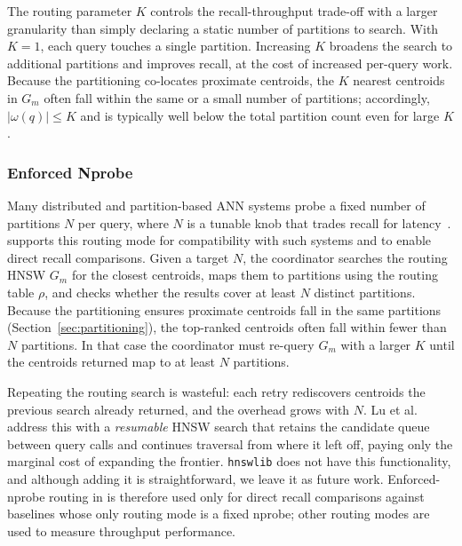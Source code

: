 \documentclass[sigconf,review,anonymous]{acmart}
\begin{document}
    The routing parameter $K$ controls the recall-throughput trade-off with a larger granularity than simply declaring a static number of partitions to search. With $K = 1$, each query touches a single partition. Increasing $K$ broadens the search to additional partitions and improves recall, at the cost of increased per-query work. Because the partitioning co-locates proximate centroids, the $K$ nearest centroids in $G_m$ often fall within the same or a small number of partitions; accordingly, $|\omega(q)| \leq K$ and is typically well below the total partition count even for large $K$ \cite{deng2019pyramid}.

\subsubsection{Enforced Nprobe}
    \label{sec:enforced-nprobe}
    Many distributed and partition-based ANN systems probe a fixed number of partitions $N$ per query, where $N$ is a tunable knob that trades recall for latency~\cite{gottesbueren2025unleashing, mohoney2025quake, jegou2011searching, chen2021spann}. \SystemName{} supports this routing mode for compatibility with such systems and to enable direct recall comparisons. Given a target $N$, the coordinator searches the routing HNSW $G_m$ for the closest centroids, maps them to partitions using the routing table $\rho$, and checks whether the results cover at least $N$ distinct partitions. Because the partitioning ensures proximate centroids fall in the same partitions (Section~\ref{sec:partitioning}), the top-ranked centroids often fall within fewer than $N$ partitions. In that case the coordinator must re-query $G_m$ with a larger $K$ until the centroids returned map to at least $N$ partitions.
    
    Repeating the routing search is wasteful: each retry rediscovers centroids the previous search already returned, and the overhead grows with $N$. Lu et al.~\cite{lu2026depth} address this with a \emph{resumable} HNSW search that retains the candidate queue between query calls and continues traversal from where it left off, paying only the marginal cost of expanding the frontier. \texttt{hnswlib} does not have this functionality, and although adding it is straightforward, we leave it as future work. Enforced-nprobe routing in \SystemName{} is therefore used only for direct recall comparisons against baselines whose only routing mode is a fixed nprobe; other routing modes are used to measure throughput performance. 
\end{document}
